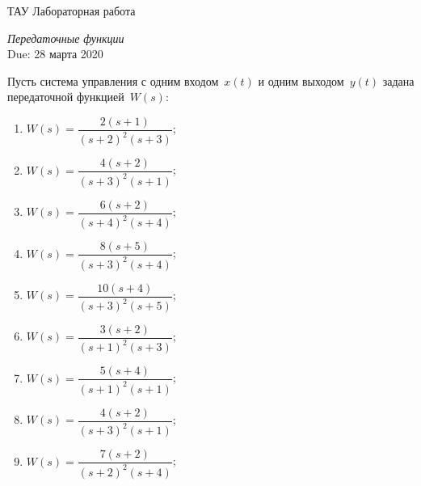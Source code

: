 \documentclass[a4paper,oneside,10pt]{book}
\theoremstyle{definition}
\begin{document}
\begin{center}
	{\large  ТАУ \hspace{0.1cm} Лабораторная работа }

	\vspace{5pt}
	\textit{\large Передаточные функции}\\ %
	\vspace{10pt}
	Due: 28 марта 2020 %
\end{center}

\vspace{0.2 cm}



Пусть система управления с одним входом~$ x(t) $ и одним выходом~$ y(t) $ задана  передаточной функцией~$ W(s) $:

\begin{multicols}{2}
	\begin{enumerate}
		\item

		      $ 	W(s) =
			      \dfrac{2(s+1)}
			      {(s+2)^2(s+3)} $;
		\item

		      $ 	W(s) =
			      \dfrac{4(s+2)}
			      {(s+3)^2(s+1)} $;

		\item

		      $ 		W(s) =
			      \dfrac{6(s+2)}
			      {(s+4)^2(s+4)} $;

		\item

		      $ 	W(s) =
			      \dfrac{8(s+5)}
			      {(s+3)^2(s+4)} $;

		\item

		      $ 	W(s) =
			      \dfrac{10(s+4)}
			      {(s+3)^2(s+5)} $;

		\item

		      $ 	W(s) =
			      \dfrac{3(s+2)}
			      {(s+1)^2(s+3)} $;

		\item

		      $ W(s) =
			      \dfrac{5(s+4)}
			      {(s+1)^2(s+1)} $;
		\item

		      $ W(s) =
			      \dfrac{4(s+2)}
			      {(s+3)^2(s+1)} $;

		\item

		      $ W(s) =
			      \dfrac{7(s+2)}
			      {(s+2)^2(s+4)} $;


\end{enumerate}
\end{multicols}
\end{document}
